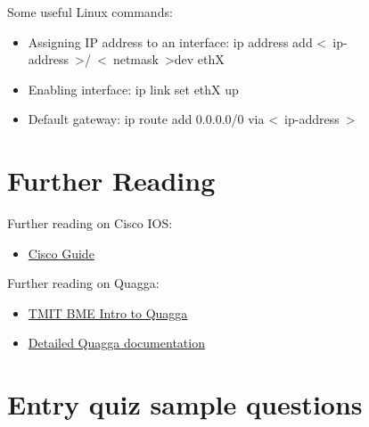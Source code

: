 \documentclass[a4paper]{article}
\begin{document}
Some useful Linux commands:

\begin{itemize}
    \item Assigning IP address to an interface: ip address add
          \textless~ip-address~\textgreater/~\textless~netmask~\textgreater dev ethX
    \item Enabling interface: ip link set ethX up
    \item Default gateway: ip route add 0.0.0.0/0 via \textless~ip-address~\textgreater
\end{itemize}

\section{Further Reading}\label{sec:further-reading}
Further reading on Cisco IOS:
\begin{itemize}
    \item \href{https://qosip.tmit.bme.hu/foswiki/pub/Meres/SwitchLinkekAggregalasaFeladatok/cisco_guide_en.doc}{Cisco
              Guide}
\end{itemize}

Further reading on Quagga:
\begin{itemize}
    \item \href{http://unixlinux.tmit.bme.hu/Quagga}{TMIT BME Intro to Quagga}
    \item \href{http://downloads.pf.itd.nrl.navy.mil/docs/ospf-manet/quagga.pdf}{Detailed Quagga documentation}
\end{itemize}

\appendix

\section{Entry quiz sample questions}
\end{document}
